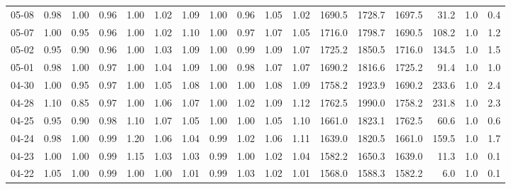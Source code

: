 \begin{threeparttable}
{\begin{tabular}{lrrrrrrrrrrrrrrrr}
  05-08 &   0.98 &   1.00 &         0.96 &     1.00 &           1.02 &        1.09 &        1.00 &        0.96 &          1.05 &          1.02 & 1690.5 & 1728.7 & 1697.5 &       31.2 &                      1.0 &                 0.4 \\
  05-07 &   1.00 &   0.95 &         0.96 &     1.00 &           1.02 &        1.10 &        1.00 &        0.97 &          1.07 &          1.05 & 1716.0 & 1798.7 & 1690.5 &      108.2 &                      1.0 &                 1.2 \\
  05-02 &   0.95 &   0.90 &         0.96 &     1.00 &           1.03 &        1.09 &        1.00 &        0.99 &          1.09 &          1.07 & 1725.2 & 1850.5 & 1716.0 &      134.5 &                      1.0 &                 1.5 \\
  05-01 &   0.98 &   1.00 &         0.97 &     1.00 &           1.04 &        1.09 &        1.00 &        0.98 &          1.07 &          1.07 & 1690.2 & 1816.6 & 1725.2 &       91.4 &                      1.0 &                 1.0 \\
  04-30 &   1.00 &   0.95 &         0.97 &     1.00 &           1.05 &        1.08 &        1.00 &        1.00 &          1.08 &          1.09 & 1758.2 & 1923.9 & 1690.2 &      233.6 &                      1.0 &                 2.4 \\
  04-28 &   1.10 &   0.85 &         0.97 &     1.00 &           1.06 &        1.07 &        1.00 &        1.02 &          1.09 &          1.12 & 1762.5 & 1990.0 & 1758.2 &      231.8 &                      1.0 &                 2.3 \\
  04-25 &   0.95 &   0.90 &         0.98 &     1.10 &           1.07 &        1.05 &        1.00 &        1.00 &          1.05 &          1.10 & 1661.0 & 1823.1 & 1762.5 &       60.6 &                      1.0 &                 0.6 \\
  04-24 &   0.98 &   1.00 &         0.99 &     1.20 &           1.06 &        1.04 &        0.99 &        1.02 &          1.06 &          1.11 & 1639.0 & 1820.5 & 1661.0 &      159.5 &                      1.0 &                 1.7 \\
  04-23 &   1.00 &   1.00 &         0.99 &     1.15 &           1.03 &        1.03 &        0.99 &        1.00 &          1.02 &          1.04 & 1582.2 & 1650.3 & 1639.0 &       11.3 &                      1.0 &                 0.1 \\
  04-22 &   1.05 &   1.00 &         0.99 &     1.00 &           1.00 &        1.01 &        0.99 &        1.03 &          1.02 &          1.01 & 1568.0 & 1588.3 & 1582.2 &        6.0 &                      1.0 &                 0.1 \\

\end{tabular}}
\end{threeparttable}
